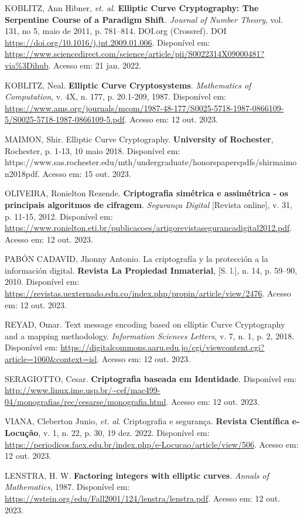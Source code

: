 KOBLITZ, Ann Hibner, \textit{et. al}. \textbf{Elliptic Curve Cryptography: The
    Serpentine Course of a Paradigm Shift}. \textit{Journal of Number Theory}, vol.
131, no 5, maio de 2011, p. 781–814. DOI.org (Crossref). DOI
\url{https://doi.org/10.1016/j.jnt.2009.01.006}. Disponível em:
\url{https://www.sciencedirect.com/science/article/pii/S0022314X09000481?via%3Dihub}. Acesso em: 21 jan. 2022.

KOBLITZ, Neal. \textbf{Elliptic Curve Cryptosystems}. \textit{Mathematics of
    Computation}, v. 4X, n. 177, p. 20.1-209, 1987. Disponível em:
\url{https://www.ams.org/journals/mcom/1987-48-177/S0025-5718-1987-0866109-5/S0025-5718-1987-0866109-5.pdf}.
Acesso em: 12 out. 2023.

MAIMON, Shir. Elliptic Curve Cryptography. \textbf{University of Rochester},
Rochester, p. 1-13, 10 maio 2018. Disponível em:
https://www.sas.rochester.edu/mth/undergraduate/honorspaperspdfs/shirmaimon2018pdf.
Acesso em: 15 out. 2023.

OLIVEIRA, Ronielton Rezende. \textbf{Criptografia simétrica e assimétrica - os
    principais algoritmos de cifragem}. \textit{Segurança Digital} [Revista
    online], v. 31, p. 11-15, 2012. Disponível em:
\url{https://www.ronielton.eti.br/publicacoes/artigorevistasegurancadigital2012.pdf}.
Acesso em: 12 out. 2023.

PABÓN CADAVID, Jhonny Antonio. La criptografía y la protección a la información
digital. \textbf{Revista La Propiedad Inmaterial}, [S. l.], n. 14, p. 59–90,
2010. Disponível em:
\url{https://revistas.uexternado.edu.co/index.php/propin/article/view/2476}.
Acesso em: 12 out. 2023.

REYAD, Omar. Text message encoding based on elliptic Curve Cryptography and a
mapping methodology. \textit{Information Sciences Letters}, v. 7, n. 1, p. 2,
2018. Disponível em:
\url{https://digitalcommons.aaru.edu.jo/cgi/viewcontent.cgi?article=1060&context=isl}.
Acesso em: 12 out. 2023.

SERAGIOTTO, Cesar. \textbf{Criptografia baseada em Identidade}. Disponível em:
\url{http://www.linux.ime.usp.br/~cef/mac499-04/monografias/rec/cesarse/monografia.html}.
Acesso em: 12 out. 2023.

VIANA, Cleberton Junio, \textit{et. al}. Criptografia e segurança.
\textbf{Revista Científica e-Locução}, v. 1, n. 22, p. 30, 19 dez. 2022.
Disponível em:
\url{https://periodicos.faex.edu.br/index.php/e-Locucao/article/view/506}.
Acesso em: 12 out. 2023.


LENSTRA, H. W. \textbf{Factoring integers with elliptic curves}. \textit{Annals
    of Mathematics}, 1987. Disponível em:
\url{https://wstein.org/edu/Fall2001/124/lenstra/lenstra.pdf}. Acesso em: 12
out. 2023.


